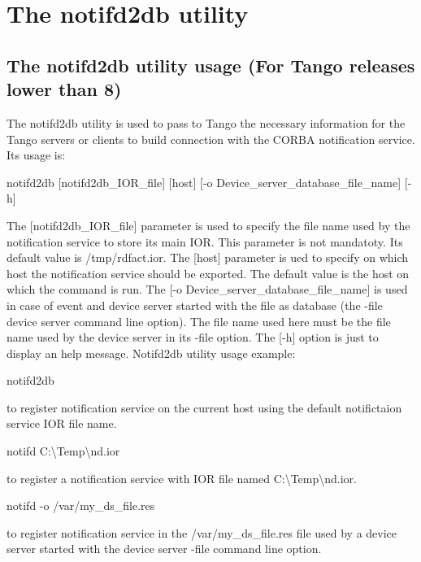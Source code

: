 
\chapter{The notifd2db utility}

\section{The notifd2db utility usage (For Tango releases lower than 8)}

The notifd2db utility is used to pass to Tango the necessary information
for the Tango servers or clients to build connection with the CORBA
notification service. Its usage is:\begin{center}notifd2db {[}notifd2db\_IOR\_file{]}
{[}host{]} {[}-o Device\_server\_database\_file\_name{]} {[}-h{]}\end{center}

The {[}notifd2db\_IOR\_file{]} parameter is used to specify the file
name used by the notification service to store its main IOR. This
parameter is not mandatoty. Its default value is /tmp/rdfact.ior.
The {[}host{]} parameter is ued to specify on which host the notification
service should be exported. The default value is the host on which
the command is run. The {[}-o Device\_server\_database\_file\_name{]}
is used in case of event and device server started with the file as
database (the -file device server command line option). The file name
used here must be the file name used by the device server in its -file
option. The {[}-h{]} option is just to display an help message. Notifd2db
utility usage example:\begin{center}notifd2db\end{center} to register
notification service on the current host using the default notifictaion
service IOR file name. \begin{center}notifd C:\textbackslash{}Temp\textbackslash{}nd.ior\end{center}
to register a notification service with IOR file named C:\textbackslash{}Temp\textbackslash{}nd.ior.\begin{center}

notifd -o /var/my\_ds\_file.res\end{center} to register notification
service in the /var/my\_ds\_file.res file used by a device server
started with the device server -file command line option.

